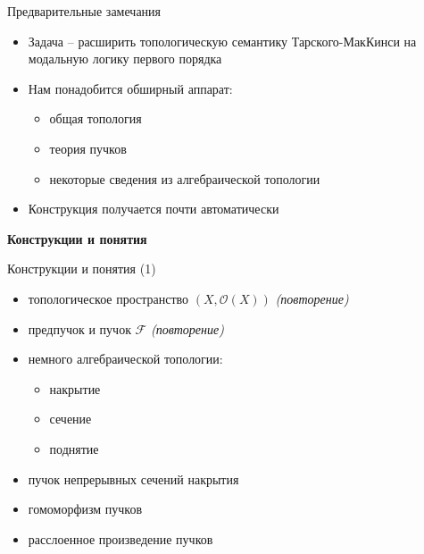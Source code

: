 \documentclass{beamer}
\begin{document}
\begin{frame}{Предварительные замечания}
\begin{itemize}
	\item Задача -- расширить топологическую семантику Тарского-МакКинси на модальную логику первого порядка
	\medskip
	\item Нам понадобится обширный аппарат:
		\medskip
		\begin{itemize}
			\item общая топология
			\item теория пучков
			\item некоторые сведения из алгебраической топологии
		\end{itemize}
	\medskip
	\item Конструкция получается почти автоматически
\end{itemize}
\end{frame}



\begin{frame}{}
\begin{center}
	\textbf{Конструкции и понятия}
\end{center}
\end{frame}

\begin{frame}{Конструкции и понятия (1)}
\begin{itemize}
	\item топологическое пространство $(X, \mathcal{O}(X))$ {\small \textit{(повторение)}}
	\item предпучок и пучок $\mathcal{F}$ {\small \textit{(повторение)}}
	\item немного алгебраической топологии:
		\medskip
		\begin{itemize}
			\item накрытие
			\item сечение
			\item поднятие
		\end{itemize}
		\medskip
	\item пучок непрерывных сечений накрытия
	\item гомоморфизм пучков
	\item расслоенное произведение пучков
\end{itemize}
\end{frame}
\end{document}
